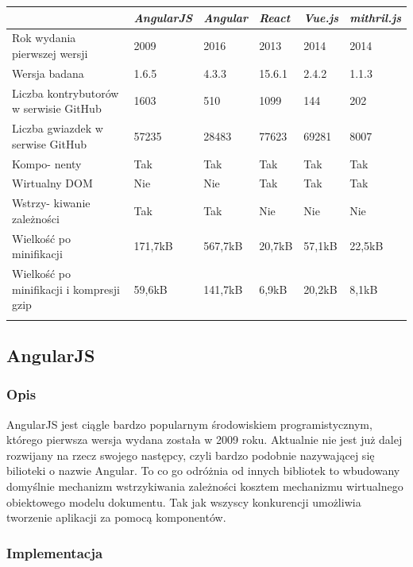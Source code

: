 \documentclass[polish, twoside, 12pt]{mwart}
\begin{document}
\begin{center}
  \begin{tabularx}{\textwidth}{|X|X|X|X|X|X|}\hline
    & \emph{AngularJS} & \emph{Angular} & \emph{React} & \emph{Vue.js} & \emph{mithril.js}\\ \hline
    Rok wydania pierwszej wersji & 2009 & 2016 & 2013 & 2014 & 2014 \\ \hline
    Wersja badana & 1.6.5 & 4.3.3 & 15.6.1 & 2.4.2 & 1.1.3 \\ \hline
    Liczba kontrybutorów w serwisie GitHub & 1603 & 510 & 1099 & 144 & 202 \\ \hline
    Liczba gwiazdek w serwise GitHub & 57235 & 28483 & 77623 & 69281 & 8007 \\ \hline
    Kompo- nenty & Tak & Tak & Tak & Tak & Tak \\ \hline
    Wirtualny DOM & Nie & Nie & Tak & Tak & Tak \\ \hline
    Wstrzy- kiwanie zależności & Tak & Tak & Nie & Nie & Nie \\ \hline
    Wielkość po minifikacji & 171,7kB & 567,7kB & 20,7kB & 57,1kB & 22,5kB \\ \hline
    Wielkość po minifikacji i kompresji gzip & 59,6kB & 141,7kB & 6,9kB & 20,2kB & 8,1kB \\ \hline
    \caption{Porównanie bibliotek}
  \end{tabularx}
\end{center}

\subsection{AngularJS}

\subsubsection{Opis}

AngularJS jest ciągle bardzo popularnym środowiskiem programistycznym, którego pierwsza wersja wydana została w 2009 roku. Aktualnie nie jest już dalej rozwijany na rzecz swojego następcy, czyli bardzo podobnie nazywającej się bilioteki o nazwie Angular. To co go odróżnia od innych bibliotek to wbudowany domyślnie mechanizm wstrzykiwania zależności kosztem mechanizmu wirtualnego obiektowego modelu dokumentu. Tak jak wszyscy konkurencji umożliwia tworzenie aplikacji za pomocą komponentów.

\subsubsection{Implementacja}
\end{document}
